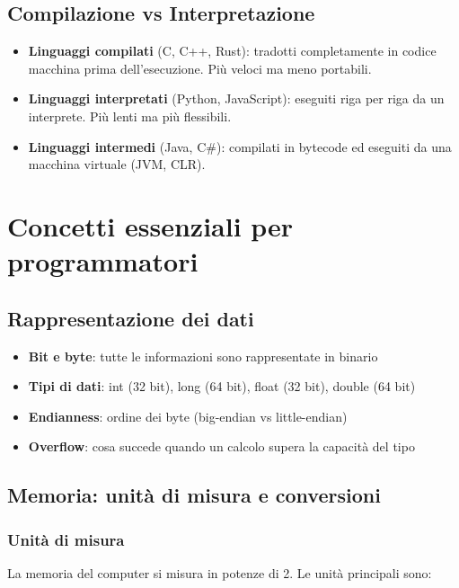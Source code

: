\documentclass[12pt,a4paper]{article}
\begin{document}
\subsection{Compilazione vs Interpretazione}
\begin{itemize}
    \item \textbf{Linguaggi compilati} (C, C++, Rust): tradotti completamente in codice macchina prima dell'esecuzione. Più veloci ma meno portabili.
    \item \textbf{Linguaggi interpretati} (Python, JavaScript): eseguiti riga per riga da un interprete. Più lenti ma più flessibili.
    \item \textbf{Linguaggi intermedi} (Java, C\#): compilati in bytecode ed eseguiti da una macchina virtuale (JVM, CLR).
\end{itemize}

\section{Concetti essenziali per programmatori}

\subsection{Rappresentazione dei dati}
\begin{itemize}
    \item \textbf{Bit e byte}: tutte le informazioni sono rappresentate in binario
    \item \textbf{Tipi di dati}: int (32 bit), long (64 bit), float (32 bit), double (64 bit)
    \item \textbf{Endianness}: ordine dei byte (big-endian vs little-endian)
    \item \textbf{Overflow}: cosa succede quando un calcolo supera la capacità del tipo
\end{itemize}

\subsection{Memoria: unità di misura e conversioni}

\subsubsection{Unità di misura}
La memoria del computer si misura in potenze di 2. Le unità principali sono:
\end{document}
